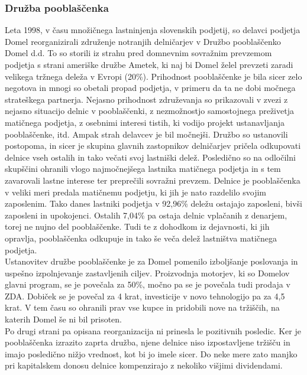 \documentclass[12pt,a4paper]{amsart}
\theoremstyle{definition} %
\theoremstyle{plain} %
\begin{document}
\subsubsection{Družba pooblaščenka}
Leta 1998, v času množičnega lastninjenja slovenskih podjetij, so delavci podjetja Domel reorganizirali združenje notranjih delničarjev v Družbo pooblaščenko Domel d.d. To so storili iz strahu pred domnevnim sovražnim prevzemom podjetja s strani ameriške družbe Ametek, ki naj bi Domel želel prevzeti zaradi velikega tržnega deleža v Evropi (20\%). Prihodnost pooblaščenke je bila sicer zelo negotova in mnogi so obetali propad podjetja, v primeru da ta ne dobi močnega strateškega partnerja. Nejasno prihodnost združevanja so prikazovali v zvezi z nejasno situacijo delnic v pooblaščenki, z nezmožnostjo samostojnega preživetja matičnega podjetja, z osebnimi interesi tistih, ki vodijo projekt ustanavljanja pooblaščenke, itd. Ampak strah delavcev je bil močnejši. Družbo so ustanovili postopoma, in sicer je skupina glavnih zastopnikov delničarjev pričela odkupovati delnice vseh ostalih in tako večati svoj lastniški delež. Posledično so na odločilni skupščini ohranili vlogo najmočnejšega lastnika matičnega podjetja in s tem zavarovali lastne interese ter preprečili sovražni prevzem. Delnice je pooblaščenka v veliki meri predala matičnemu podjetju, ki jih je nato razdelilo svojim zaposlenim. Tako danes lastniki podjetja v 92,96\% deležu ostajajo zaposleni, bivši zaposleni in upokojenci. Ostalih 7,04\% pa ostaja delnic vplačanih z denarjem, torej ne nujno del pooblaščenke. Tudi te z dohodkom iz dejavnosti, ki jih opravlja, pooblaščenka odkupuje in tako še veča delež lastništva matičnega podjetja. \\
Ustanovitev družbe pooblaščenke je za Domel pomenilo izboljšanje poslovanja in uspešno izpolnjevanje zastavljenih ciljev. Proizvodnja motorjev, ki so Domelov glavni program, se je povečala za 50\%, močno pa se je povečala tudi prodaja v ZDA. Dobiček se je povečal za 4 krat, investicije v novo tehnologijo pa za 4,5 krat. V tem času so ohranili prav vse kupce in pridobili nove na tržiščih, na katerih Domel še ni bil prisoten.\\
Po drugi strani pa opisana reorganizacija ni prinesla le pozitivnih posledic. Ker je pooblaščenka izrazito zaprta družba, njene delnice niso izpostavljene tržišču in imajo posledično nižjo vrednost, kot bi jo imele sicer. Do neke mere zato manjko pri kapitalskem donosu delnice kompenzirajo z nekoliko višjimi dividendami.
\end{document}
